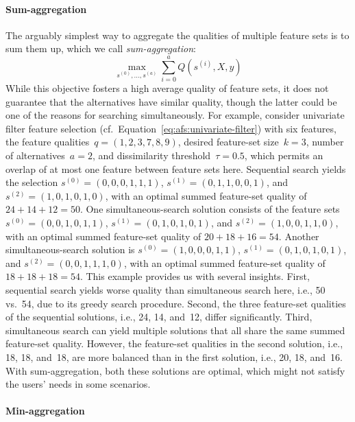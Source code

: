 \documentclass{article}
\theoremstyle{definition}
\begin{document}
\paragraph{Sum-aggregation}

The arguably simplest way to aggregate the qualities of multiple feature sets is to sum them up, which we call \emph{sum-aggregation}:
%
\begin{equation}
	\max_{s^{(0)}, \dots, s^{(a)}} \sum_{i=0}^a Q(s^{(i)},X,y)
	\label{eq:afs:afs-simultaneous-sum-objective}
\end{equation}
%
While this objective fosters a high average quality of feature sets, it does not guarantee that the alternatives have similar quality, though the latter could be one of the reasons for searching simultaneously.
For example, consider univariate filter feature selection (cf.~Equation~\ref{eq:afs:univariate-filter}) with six features, the feature qualities~$q = (1,2,3,7,8,9)$, desired feature-set size~$k=3$, number of alternatives~$a=2$, and dissimilarity threshold~$\tau = 0.5$, which permits an overlap of at most one feature between feature sets here.
Sequential search yields the selection $s^{(0)} = (0,0,0,1,1,1)$, $s^{(1)} = (0,1,1,0,0,1)$, and $s^{(2)} = (1,0,1,0,1,0)$, with an optimal summed feature-set quality of $24+14+12=50$.
One simultaneous-search solution consists of the feature sets $s^{(0)} = (0,0,1,0,1,1)$, $s^{(1)} = (0,1,0,1,0,1)$, and $s^{(2)} = (1,0,0,1,1,0)$, with an optimal summed feature-set quality of $20+18+16=54$.
Another simultaneous-search solution is $s^{(0)} = (1,0,0,0,1,1)$, $s^{(1)} = (0,1,0,1,0,1)$, and $s^{(2)} = (0,0,1,1,1,0)$, with an optimal summed feature-set quality of $18+18+18=54$.
This example provides us with several insights.
First, sequential search yields worse quality than simultaneous search here, i.e., 50 vs.~54, due to its greedy search procedure.
Second, the three feature-set qualities of the sequential solutions, i.e., 24, 14, and~12, differ significantly.
Third, simultaneous search can yield multiple solutions that all share the same summed feature-set quality.
However, the feature-set qualities in the second solution, i.e., 18, 18, and~18, are more balanced than in the first solution, i.e., 20, 18, and~16.
With sum-aggregation, both these solutions are optimal, which might not satisfy the users' needs in some scenarios.

\paragraph{Min-aggregation}
\end{document}
